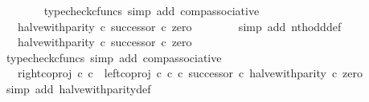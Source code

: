 \begin{isabellebody}
\ \ \ \ \ \ \isamarkupfalse%
\ {\isacharparenleft}{\kern0pt}typecheck{\isacharunderscore}{\kern0pt}cfuncs{\isacharcomma}{\kern0pt}\ simp\ add{\isacharcolon}{\kern0pt}\ comp{\isacharunderscore}{\kern0pt}associative{}{\isacharparenright}{\kern0pt}\isanewline
\ \ \ \ \isamarkupfalse%
\ \isamarkupfalse%
\ {\isachardoublequoteopen}{\isachardot}{\kern0pt}{\isachardot}{\kern0pt}{\isachardot}{\kern0pt}\ {\isacharequal}{\kern0pt}\ halve{\isacharunderscore}{\kern0pt}with{\isacharunderscore}{\kern0pt}parity\ {\isasymcirc}\isactrlsub c\ successor\ {\isasymcirc}\isactrlsub c\ zero{\isachardoublequoteclose}\isanewline
\ \ \ \ \ \ \isamarkupfalse%
\ {\isacharparenleft}{\kern0pt}simp\ add{\isacharcolon}{\kern0pt}\ nth{\isacharunderscore}{\kern0pt}odd{\isacharunderscore}{\kern0pt}def{}{\isacharparenright}{\kern0pt}\isanewline
\ \ \ \ \isamarkupfalse%
\ \isamarkupfalse%
\ {\isachardoublequoteopen}{\isachardot}{\kern0pt}{\isachardot}{\kern0pt}{\isachardot}{\kern0pt}\ {\isacharequal}{\kern0pt}\ {\isacharparenleft}{\kern0pt}halve{\isacharunderscore}{\kern0pt}with{\isacharunderscore}{\kern0pt}parity\ {\isasymcirc}\isactrlsub c\ successor{\isacharparenright}{\kern0pt}\ {\isasymcirc}\isactrlsub c\ zero{\isachardoublequoteclose}\isanewline
\ \ \ \ \ \ \isamarkupfalse%
\ {\isacharparenleft}{\kern0pt}typecheck{\isacharunderscore}{\kern0pt}cfuncs{\isacharcomma}{\kern0pt}\ simp\ add{\isacharcolon}{\kern0pt}\ comp{\isacharunderscore}{\kern0pt}associative{}{\isacharparenright}{\kern0pt}\isanewline
\ \ \ \ \isamarkupfalse%
\ \isamarkupfalse%
\ {\isachardoublequoteopen}{\isachardot}{\kern0pt}{\isachardot}{\kern0pt}{\isachardot}{\kern0pt}\ {\isacharequal}{\kern0pt}\ {\isacharparenleft}{\kern0pt}right{\isacharunderscore}{\kern0pt}coproj\ {\isasymnat}\isactrlsub c\ {\isasymnat}\isactrlsub c\ {\isasymamalg}\ {\isacharparenleft}{\kern0pt}left{\isacharunderscore}{\kern0pt}coproj\ {\isasymnat}\isactrlsub c\ {\isasymnat}\isactrlsub c\ {\isasymcirc}\isactrlsub c\ successor{\isacharparenright}{\kern0pt}\ {\isasymcirc}\isactrlsub c\ halve{\isacharunderscore}{\kern0pt}with{\isacharunderscore}{\kern0pt}parity{\isacharparenright}{\kern0pt}\ {\isasymcirc}\isactrlsub c\ zero{\isachardoublequoteclose}\isanewline
\ \ \ \ \ \ \isamarkupfalse%
\ {\isacharparenleft}{\kern0pt}simp\ add{\isacharcolon}{\kern0pt}\ halve{\isacharunderscore}{\kern0pt}with{\isacharunderscore}{\kern0pt}parity{\isacharunderscore}{\kern0pt}def{}{\isacharparenright}{\kern0pt}\isanewline

\end{isabellebody}

